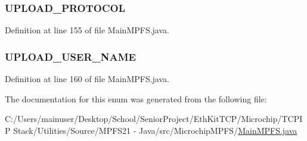 \subsubsection[{U\+P\+L\+O\+A\+D\+\_\+\+P\+R\+O\+T\+O\+C\+O\+L}]{\setlength{\rightskip}{0pt plus 5cm}U\+P\+L\+O\+A\+D\+\_\+\+P\+R\+O\+T\+O\+C\+O\+L}\label{enum_microchip_m_p_f_s_1_1_main_m_p_f_s_1_1e_xml_node_attribute_ad328a722790f60a0405133e8345f292f}


Definition at line 155 of file Main\+M\+P\+F\+S.\+java.

\hypertarget{enum_microchip_m_p_f_s_1_1_main_m_p_f_s_1_1e_xml_node_attribute_ae8dd10b4ffc415ad9367d10bfd04d68c}{}
\subsubsection[{U\+P\+L\+O\+A\+D\+\_\+\+U\+S\+E\+R\+\_\+\+N\+A\+M\+E}]{\setlength{\rightskip}{0pt plus 5cm}U\+P\+L\+O\+A\+D\+\_\+\+U\+S\+E\+R\+\_\+\+N\+A\+M\+E}\label{enum_microchip_m_p_f_s_1_1_main_m_p_f_s_1_1e_xml_node_attribute_ae8dd10b4ffc415ad9367d10bfd04d68c}


Definition at line 160 of file Main\+M\+P\+F\+S.\+java.



The documentation for this enum was generated from the following file\+:\begin{DoxyCompactItemize}
\item 
C\+:/\+Users/mainuser/\+Desktop/\+School/\+Senior\+Project/\+Eth\+Kit\+T\+C\+P/\+Microchip/\+T\+C\+P\+I\+P Stack/\+Utilities/\+Source/\+M\+P\+F\+S21 -\/ Java/src/\+Microchip\+M\+P\+F\+S/\hyperlink{_main_m_p_f_s_8java}{Main\+M\+P\+F\+S.\+java}\end{DoxyCompactItemize}
